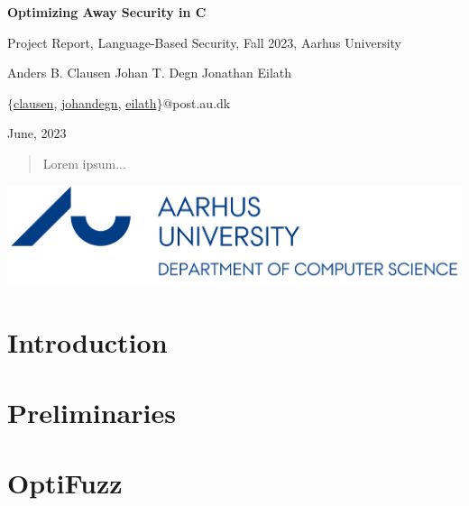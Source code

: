 \documentclass{article}
\begin{document}
\begin{titlepage}
  \vspace*{\fill}
  \begin{center}
    \huge
    \textbf{Optimizing Away Security in C}
        
    \vspace{0.2cm}
    \small
    Project Report, Language-Based Security, Fall 2023, Aarhus University
        
    \vspace{0.4cm}
    \large
    Anders B. Clausen \qquad Johan T. Degn \qquad Jonathan Eilath

    \vspace{0.2cm}
    \small
    $\{$\href{mailto:clausen@post.au.com}{clausen}, \href{mailto:johandegn@post.au.com}{johandegn}, \href{mailto:eilath@post.au.com}{eilath}$\}$@post.au.dk

    \vspace{0.4cm}
    June, 2023
  \end{center}

  \begin{abstract}
    Lorem ipsum...
  \end{abstract}

  \vspace*{\fill}

  \begin{center}
    \includegraphics*[width=0.2\linewidth]{assets/au_logo.png}
  \end{center}
\end{titlepage}

\pagebreak

\tableofcontents

\pagebreak
{} 
\section{Introduction}


\section{Preliminaries}


\section{OptiFuzz}

\end{document}
